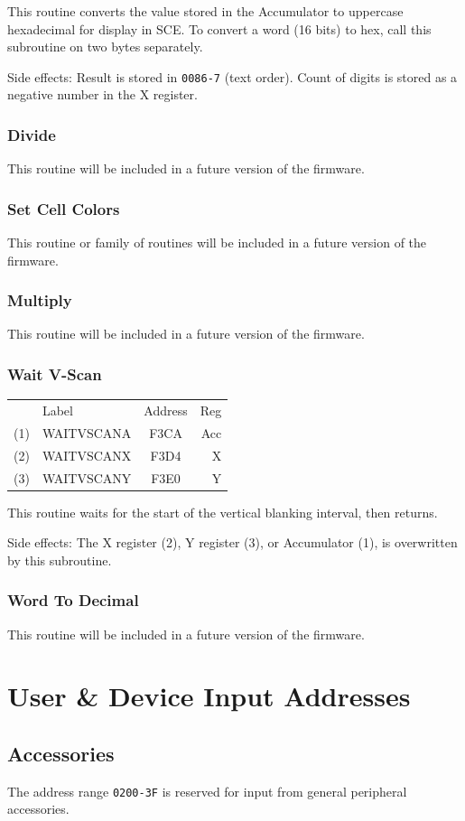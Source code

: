 \documentclass[12pt]{{memoir}}
\newcommand\fwsubroutinehdr[1]{%
\filbreak
\subsubsection{#1}}
\begin{document}
This routine converts the value stored in the Accumulator to uppercase hexadecimal for display in SCE. To convert a word (16 bits) to hex, call this subroutine on two bytes separately.

Side effects: Result is stored in \texttt{0086-7} (text order). Count of digits is stored as a negative number in the X register.

\fwsubroutinehdr{Divide}

This routine will be included in a future version of the firmware.

\fwsubroutinehdr{Set Cell Colors}

This routine or family of routines will be included in a future version of the firmware.

\fwsubroutinehdr{Multiply}

This routine will be included in a future version of the firmware.

\fwsubroutinehdr{Wait V-Scan}

\begin{center}\begin{tabular}{r>{\ttfamily}l>{\ttfamily}cr}
& \textrm{Label} & \textrm{Address} & Reg \\
(1) & WAITVSCANA & F3CA & Acc \\
(2) & WAITVSCANX & F3D4 & X \\
(3) & WAITVSCANY & F3E0 & Y \\
\end{tabular}\end{center}

This routine waits for the start of the vertical blanking interval, then returns. 

Side effects: The X register (2), Y register (3), or Accumulator (1), is overwritten by this subroutine.

\fwsubroutinehdr{Word To Decimal}

This routine will be included in a future version of the firmware.

\newpage
\section{User \& Device Input Addresses}
\label{sec:userinput}

\subsection{Accessories}

The address range \texttt{0200-3F} is reserved for input from general peripheral accessories.
\end{document}
